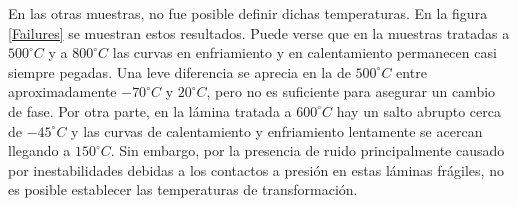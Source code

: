 \documentclass[12pt]{article}
\theoremstyle{definition}
\theoremstyle{remark}
\begin{document}
{En las otras muestras, no fue posible definir dichas temperaturas. En la figura \ref{Failures} se muestran estos resultados. Puede verse que en la muestras tratadas a $500 ^\circ C$ y a $800 ^\circ C$ las curvas en enfriamiento y en calentamiento permanecen casi siempre pegadas. Una leve diferencia se aprecia en la de  $500 ^\circ C$ entre aproximadamente $-70 ^\circ C$ y $20 ^\circ C$, pero no es suficiente para asegurar un cambio de fase. Por otra parte, en la lámina tratada a $600 ^\circ C$ hay un salto abrupto cerca de  $-45 ^\circ C$ y las curvas de calentamiento y enfriamiento lentamente se acercan llegando a $150 ^\circ C$. Sin embargo, por la presencia de ruido principalmente causado por inestabilidades debidas a los contactos a presión en estas láminas frágiles, no es posible establecer las temperaturas de transformación.

}
\end{document}
